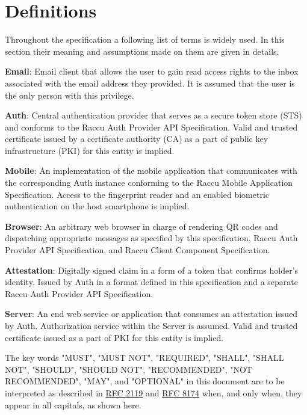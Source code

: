 \section{Definitions}
Throughout the specification a following list of terms is widely used. In this section their meaning and assumptions 
made on them are given in details.

\medskip
\textbf{Email}: Email client that allows the user to gain read access rights to the inbox associated
with the email address they provided. It is assumed that the user is the only person with this privilege.

\medskip
\textbf{Auth}: Central authentication provider that serves as a secure token store (STS) and conforms to 
the Raccu Auth Provider API Specification. Valid and trusted certificate issued by a certificate authority
(CA) as a part of public key infrastructure (PKI) for this entity is implied.

\medskip
\textbf{Mobile}: An implementation of the mobile application that communicates with the corresponding Auth instance 
conforming to the Raccu Mobile Application Specification. Access to the fingerprint reader and an enabled biometric 
authentication on the host smartphone is implied.

\medskip
\textbf{Browser}: An arbitrary web browser in charge of rendering QR codes and dispatching appropriate messages  
as specified by this specification, Raccu Auth Provider API Specification, and Raccu Client Component Specification.

\medskip
\textbf{Attestation}: Digitally signed claim in a form of a token that confirms holder's identity. Issued by 
Auth in a format defined in this specification and a separate Raccu Auth Provider API Specification.

\medskip
\textbf{Server}: An end web service or application that consumes an attestation issued by Auth. Authorization service 
within the Server is assumed. Valid and trusted certificate issued as a part of PKI for this entity is implied.

\medskip
The key words "MUST", "MUST NOT", "REQUIRED", "SHALL", "SHALL NOT", "SHOULD", "SHOULD NOT", "RECOMMENDED", 
"NOT RECOMMENDED", "MAY", and "OPTIONAL" in this document are to be interpreted as described in 
\href{https://tools.ietf.org/html/rfc2119}{RFC 2119} and \href{https://tools.ietf.org/html/rfc8174}{RFC 8174} 
when, and only when, they appear in all capitals, as shown here.
